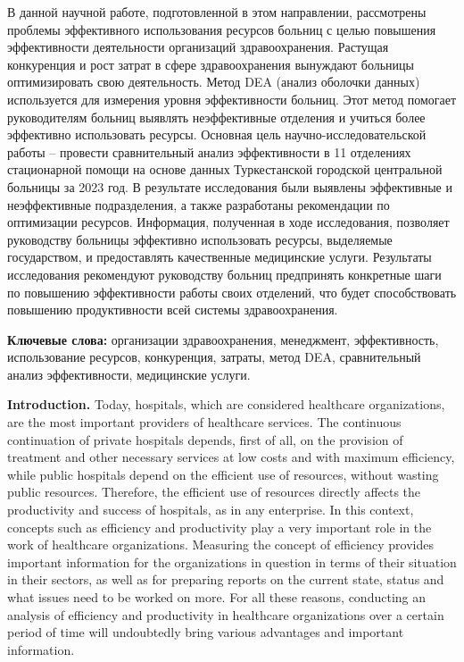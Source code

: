 В данной научной работе, подготовленной в этом направлении, рассмотрены
проблемы эффективного использования ресурсов больниц с целью повышения
эффективности деятельности организаций здравоохранения. Растущая
конкуренция и рост затрат в сфере здравоохранения вынуждают больницы
оптимизировать свою деятельность. Метод DEA (анализ оболочки данных)
используется для измерения уровня эффективности больниц. Этот метод
помогает руководителям больниц выявлять неэффективные отделения и
учиться более эффективно использовать ресурсы. Основная цель
научно-исследовательской работы -- провести сравнительный анализ
эффективности в 11 отделениях стационарной помощи на основе данных
Туркестанской городской центральной больницы за 2023 год. В результате
исследования были выявлены эффективные и неэффективные подразделения, а
также разработаны рекомендации по оптимизации ресурсов. Информация,
полученная в ходе исследования, позволяет руководству больницы
эффективно использовать ресурсы, выделяемые государством, и
предоставлять качественные медицинские услуги. Результаты исследования
рекомендуют руководству больниц предпринять конкретные шаги по повышению
эффективности работы своих отделений, что будет способствовать повышению
продуктивности всей системы здравоохранения.

{\bfseries Ключевые слова:} организации здравоохранения, менеджмент,
эффективность, использование ресурсов, конкуренция, затраты, метод DEA,
сравнительный анализ эффективности, медицинские услуги.

{\bfseries Introduction.} Today, hospitals, which are considered healthcare
organizations, are the most important providers of healthcare services.
The continuous continuation of private hospitals depends, first of all,
on the provision of treatment and other necessary services at low costs
and with maximum efficiency, while public hospitals depend on the
efficient use of resources, without wasting public resources. Therefore,
the efficient use of resources directly affects the productivity and
success of hospitals, as in any enterprise. In this context, concepts
such as efficiency and productivity play a very important role in the
work of healthcare organizations. Measuring the concept of efficiency
provides important information for the organizations in question in
terms of their situation in their sectors, as well as for preparing
reports on the current state, status and what issues need to be worked
on more. For all these reasons, conducting an analysis of efficiency and
productivity in healthcare organizations over a certain period of time
will undoubtedly bring various advantages and important information.

